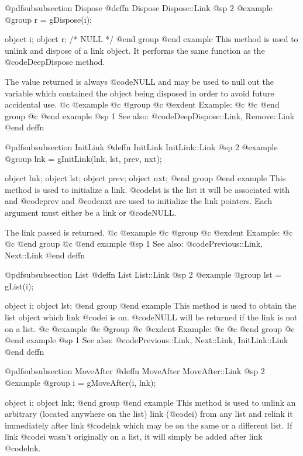 @pdfsubsubsection {Dispose}
@deffn {Dispose} Dispose::Link
@sp 2
@example
@group
r = gDispose(i);

object  i;
object  r;     /*  NULL  */
@end group
@end example
This method is used to unlink and dispose of a link object.
It performs the same function as the @code{DeepDispose} method.

The value returned is always @code{NULL} and may be used to null out
the variable which contained the object being disposed in order to
avoid future accidental use.
@c @example
@c @group
@c @exdent Example:
@c 
@c @end group
@c @end example
@sp 1
See also:  @code{DeepDispose::Link, Remove::Link}
@end deffn














@pdfsubsubsection {InitLink}
@deffn {InitLink} InitLink::Link
@sp 2
@example
@group
lnk = gInitLink(lnk, lst, prev, nxt);

object  lnk;
object  lst;
object  prev;
object  nxt;
@end group
@end example
This method is used to initialize a link.  @code{lst} is the list it will
be associated with and @code{prev} and @code{nxt} are used to initialize
the link pointers.  Each argument must either be a link or @code{NULL}.

The link passed is returned.
@c @example
@c @group
@c @exdent Example:
@c 
@c @end group
@c @end example
@sp 1
See also:  @code{Previous::Link, Next::Link}
@end deffn





@pdfsubsubsection {List}
@deffn {List} List::Link
@sp 2
@example
@group
lst = gList(i);

object  i;
object  lst;
@end group
@end example
This method is used to obtain the list object which link @code{i}
is on.  @code{NULL} will be returned if the link is not on a list.
@c @example
@c @group
@c @exdent Example:
@c 
@c @end group
@c @end example
@sp 1
See also:  @code{Previous::Link, Next::Link, InitLink::Link}
@end deffn









@pdfsubsubsection {MoveAfter}
@deffn {MoveAfter} MoveAfter::Link
@sp 2
@example
@group
i = gMoveAfter(i, lnk);

object  i;
object  lnk;
@end group
@end example
This method is used to unlink an arbitrary (located anywhere on the
list) link (@code{i}) from any list and relink it immediately after link
@code{lnk} which may be on the same or a different list.  If link
@code{i} wasn't originally on a list, it will simply be added after
link @code{lnk}.

